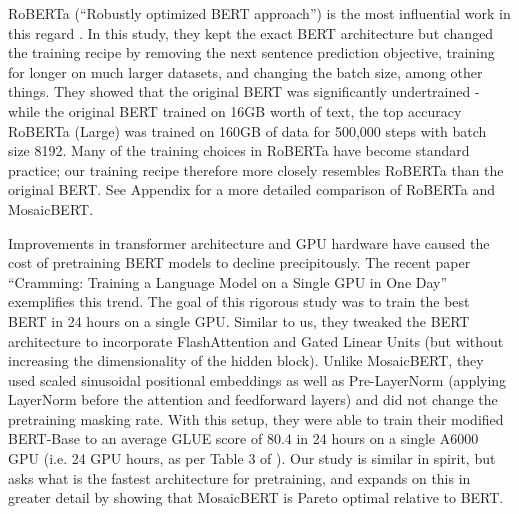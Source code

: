 \documentclass{article}
\begin{document}
RoBERTa (``Robustly optimized BERT approach'') is the most influential work in this regard \citep{liu2019roberta}. In this study, they kept the exact BERT architecture but changed the training recipe by removing the next sentence prediction objective, training for longer on much larger datasets, and changing the batch size, among other things. They showed that the original BERT was significantly undertrained - while the original BERT trained on 16GB worth of text, the top accuracy RoBERTa (Large) was trained on 160GB of data for 500,000 steps with batch size 8192. Many of the training choices in RoBERTa have become standard practice; our training recipe therefore more closely resembles RoBERTa than the original BERT. See Appendix for a more detailed comparison of RoBERTa and MosaicBERT.




Improvements in transformer architecture and GPU hardware have caused the cost of pretraining BERT models to decline precipitously.
The recent paper “Cramming: Training a Language Model on a Single GPU in One Day” \citep{geiping2023cramming} exemplifies this trend. The goal of this rigorous study was to train the best BERT in 24 hours on a single GPU. Similar to us, they tweaked the BERT architecture to incorporate FlashAttention and Gated Linear Units (but without increasing the dimensionality of the hidden block). Unlike MosaicBERT, they used scaled sinusoidal positional embeddings \citep{vaswani2017attention} as well as Pre-LayerNorm (applying LayerNorm before the attention and feedforward layers) and did not change the pretraining masking rate. With this setup, they were able to train their modified BERT-Base to an average GLUE score of 80.4 in 24 hours on a single A6000 GPU (i.e. 24 GPU hours, as per Table 3 of \citep{geiping2023cramming}). Our study is similar in spirit, but asks what is the fastest architecture for pretraining, and expands on this in greater detail by showing that MosaicBERT is Pareto optimal relative to BERT.
\end{document}
